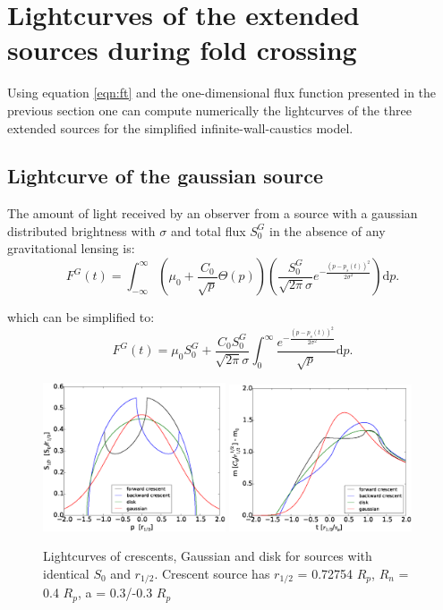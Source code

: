 \documentclass[usenatbib]{mn2e}
\begin{document}
\section{Lightcurves of the extended sources during fold crossing}\label{sec:fold-crossing}

Using equation \ref{eqn:ft} and the one-dimensional flux function
presented in the previous section one can compute numerically the
lightcurves of the three extended sources for the simplified
infinite-wall-caustics model.

\subsection{Lightcurve of the gaussian source}

The amount of light received by an observer from a source with a gaussian distributed brightness with $\sigma$ and total flux $S_0^G$ in the absence of any gravitational lensing is:
\begin{equation}
 F^G(t) = \int_{-\infty}^\infty  \left( \mu_0 + \frac{C_0}{\sqrt{p}} \Theta \left( p \right) \right) \left( \frac{S_0^G}{\sqrt{2 \pi} \sigma} e^{-\frac{(p-p_s(t))^2}{2 \sigma^2}} \right) \mathrm{d}p.
\end{equation}

which can be simplified to:
\begin{equation}
 F^G(t) = \mu_0 S_0^G + \frac{C_0 S_0^G}{\sqrt{2\pi} \sigma} \int_{0}^\infty \frac{e^{-\frac{(p-p_s(t))^2}{2 \sigma^2}}}{\sqrt{p}} \mathrm{d}p.
\end{equation}



\begin{figure}
\centering
    \includegraphics[width = 0.48\textwidth]{figures/S1D_all.eps}
    \includegraphics[width = 0.48\textwidth]{figures/4source_magnification.eps}
\caption{\label{fig:lightcurve_gauss} Lightcurves of crescents, Gaussian and disk for sources with identical $S_0$ and $r_{1/2}$. Crescent source has $r_{1/2}$ = 0.72754 $R_p$, $R_n$ = 0.4 $R_p$, a = 0.3/-0.3 $R_p$ }
\end{figure}
\end{document}
